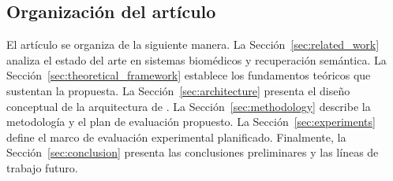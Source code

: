 \subsection{Organización del artículo}
\label{subsec:organization}

El artículo se organiza de la siguiente manera. La Sección~\ref{sec:related_work} analiza el estado del arte en sistemas \rag{} biomédicos y recuperación semántica. La Sección~\ref{sec:theoretical_framework} establece los fundamentos teóricos que sustentan la propuesta. La Sección~\ref{sec:architecture} presenta el diseño conceptual de la arquitectura de \sirca{}. La Sección~\ref{sec:methodology} describe la metodología y el plan de evaluación propuesto. La Sección~\ref{sec:experiments} define el marco de evaluación experimental planificado. Finalmente, la Sección~\ref{sec:conclusion} presenta las conclusiones preliminares y las líneas de trabajo futuro.
